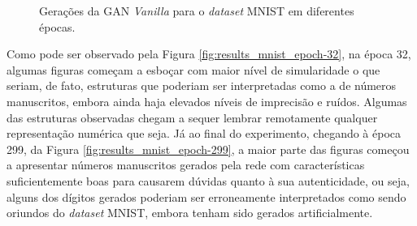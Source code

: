 \begin{figure}[H]
{        \label{fig:results_mnist_epoch-32}
    }
    \hspace{0.5cm}
    \caption{Gerações da GAN \textit{Vanilla} para o \textit{dataset} MNIST em diferentes épocas.}
    \label{fig:results_mnist}
\end{figure}

Como pode ser observado pela Figura \ref{fig:results_mnist_epoch-32}, na época 32, algumas figuras começam a esboçar com maior nível de simularidade o que seriam, de fato, estruturas que poderiam ser interpretadas como a de números manuscritos, embora ainda haja elevados níveis de imprecisão e ruídos. Algumas das estruturas observadas chegam a sequer lembrar remotamente qualquer representação numérica que seja. Já ao final do experimento, chegando à época 299, da Figura \ref{fig:results_mnist_epoch-299}, a maior parte das figuras começou a apresentar números manuscritos gerados pela rede com características suficientemente boas para causarem dúvidas quanto à sua autenticidade, ou seja, alguns dos dígitos gerados poderiam ser erroneamente interpretados como sendo oriundos do \textit{dataset} MNIST, embora tenham sido gerados artificialmente.


